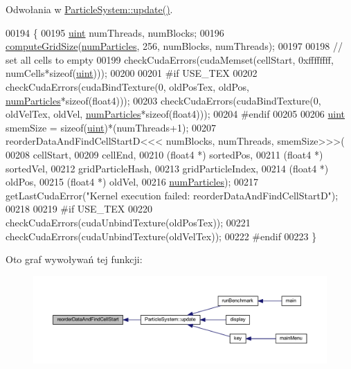 Odwołania w \hyperlink{particle_system_8cpp_source_l00266}{Particle\-System\-::update()}.


\begin{DoxyCode}
00194     \{
00195         \hyperlink{particles__kernel_8cuh_a91ad9478d81a7aaf2593e8d9c3d06a14}{uint} numThreads, numBlocks;
00196         \hyperlink{particle_system__cuda_8cu_a78e8aa50e0629b57cff219a2fa753ed0}{computeGridSize}(\hyperlink{particles_8cpp_a05b8a90212054a3eb1a036ae0c269596}{numParticles}, 256, numBlocks, numThreads);
00197 
00198         \textcolor{comment}{// set all cells to empty}
00199         checkCudaErrors(cudaMemset(cellStart, 0xffffffff, numCells*\textcolor{keyword}{sizeof}(\hyperlink{particles__kernel_8cuh_a91ad9478d81a7aaf2593e8d9c3d06a14}{uint})));
00200 
00201 \textcolor{preprocessor}{#if USE\_TEX}
00202 \textcolor{preprocessor}{}        checkCudaErrors(cudaBindTexture(0, oldPosTex, oldPos, \hyperlink{particles_8cpp_a05b8a90212054a3eb1a036ae0c269596}{numParticles}*\textcolor{keyword}{sizeof}(float4)));
00203         checkCudaErrors(cudaBindTexture(0, oldVelTex, oldVel, \hyperlink{particles_8cpp_a05b8a90212054a3eb1a036ae0c269596}{numParticles}*\textcolor{keyword}{sizeof}(float4)));
00204 \textcolor{preprocessor}{#endif}
00205 \textcolor{preprocessor}{}
00206         \hyperlink{particles__kernel_8cuh_a91ad9478d81a7aaf2593e8d9c3d06a14}{uint} smemSize = \textcolor{keyword}{sizeof}(\hyperlink{particles__kernel_8cuh_a91ad9478d81a7aaf2593e8d9c3d06a14}{uint})*(numThreads+1);
00207         reorderDataAndFindCellStartD<<< numBlocks, numThreads, smemSize>>>(
00208             cellStart,
00209             cellEnd,
00210             (float4 *) sortedPos,
00211             (float4 *) sortedVel,
00212             gridParticleHash,
00213             gridParticleIndex,
00214             (float4 *) oldPos,
00215             (float4 *) oldVel,
00216             \hyperlink{particles_8cpp_a05b8a90212054a3eb1a036ae0c269596}{numParticles});
00217         getLastCudaError(\textcolor{stringliteral}{"Kernel execution failed: reorderDataAndFindCellStartD"});
00218 
00219 \textcolor{preprocessor}{#if USE\_TEX}
00220 \textcolor{preprocessor}{}        checkCudaErrors(cudaUnbindTexture(oldPosTex));
00221         checkCudaErrors(cudaUnbindTexture(oldVelTex));
00222 \textcolor{preprocessor}{#endif}
00223 \textcolor{preprocessor}{}    \}
\end{DoxyCode}


Oto graf wywoływań tej funkcji\-:\nopagebreak
\begin{figure}[H]
\begin{center}
\leavevmode
\includegraphics[width=350pt]{particle_system__cuda_8cu_ac72ccd068434c46c2f901c751d53be1d_icgraph}
\end{center}
\end{figure}


